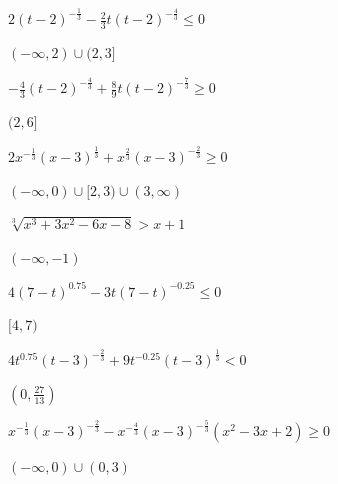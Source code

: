 \documentclass{ximera}
\begin{document}
\begin{question}
\begin{problem}
$2 (t-2)^{-\frac{1}{3}} -\frac{2}{3} t(t-2)^{-\frac{4}{3}} \leq 0$ 

\begin{solution}
$(-\infty, 2) \cup (2,3]$
\end{solution}
\end{problem}

\begin{problem}
$-\frac{4}{3} (t-2)^{-\frac{4}{3}} + \frac{8}{9} t (t-2)^{-\frac{7}{3}} \geq 0$

\begin{solution}
$(2,6]$
\end{solution}
\end{problem}

\begin{problem}
$2x^{-\frac{1}{3}}(x-3)^{\frac{1}{3}} + x^{\frac{2}{3}} (x-3)^{-\frac{2}{3}} \geq 0$

\begin{solution}
$(-\infty, 0) \cup [2,3) \cup (3, \infty)$
\end{solution}
\end{problem}

\begin{problem}
$\sqrt[3]{x^{3} + 3x^{2} - 6x - 8} > x + 1$ 

\begin{solution}
$(-\infty, -1)$  
\end{solution}
\end{problem}

\begin{problem}
$4(7-t)^{0.75} - 3t(7-t)^{-0.25} \leq 0$  

\begin{solution}
$[4,7)$  
\end{solution}
\end{problem}

\begin{problem}
$4t^{0.75}(t - 3)^{-\frac{2}{3}} +9t^{-0.25}(t - 3)^{\frac{1}{3}} < 0$

\begin{solution}
$\left(0, \frac{27}{13} \right)$
\end{solution}
\end{problem}

\begin{problem}
$x^{-\frac{1}{3}} (x-3)^{-\frac{2}{3}} - x^{-\frac{4}{3}} (x-3)^{-\frac{5}{3}} (x^2-3x+2) \geq 0$  

\begin{solution}
$(-\infty, 0) \cup (0,3)$   
\end{solution}
\end{problem}


\end{question}
\end{document}
